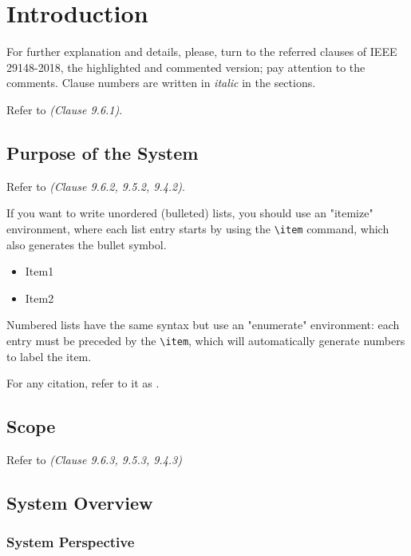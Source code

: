 
\chapter{Introduction} \label{introduction}

For further explanation and details, please, turn to the referred clauses of IEEE 29148-2018, the highlighted and commented version; pay attention to the comments. Clause numbers are written in \textit{italic} in the sections.

Refer to \textit{(Clause 9.6.1)}. 

\section{Purpose of the System }
 Refer to \textit{(Clause 9.6.2, 9.5.2, 9.4.2)}. 

If you want to write unordered (bulleted) lists, you should use an "itemize" environment, where each list entry starts by using the \verb|\item| command, which also generates the bullet symbol.

\begin{itemize}
    \item Item1  
    \item Item2 
\end{itemize}

Numbered lists have the same syntax but use an "enumerate" environment: each entry must be preceded by the \verb|\item|, which will automatically generate numbers to label the item. 

For any citation, refer to it as \cite{younis2021hybrid}.

\section{Scope}

Refer to \textit{(Clause 9.6.3, 9.5.3, 9.4.3)}

\section{System Overview}


\subsection{System Perspective}

